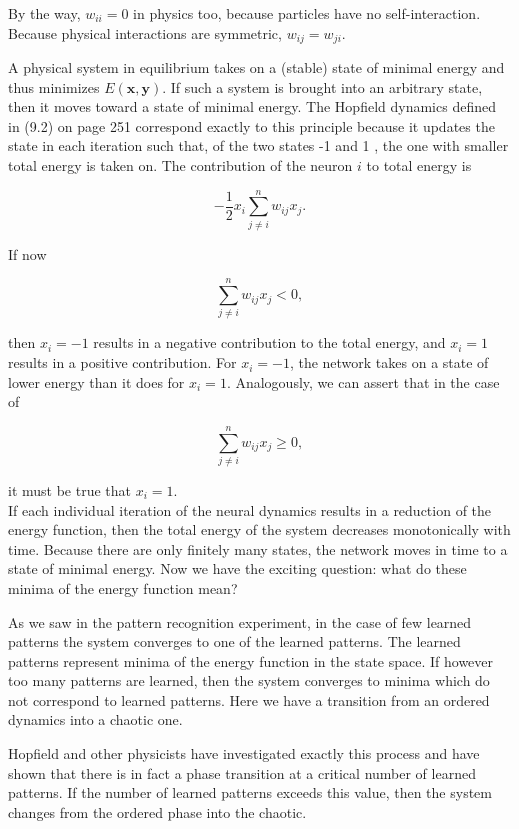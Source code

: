 \documentclass[10pt]{book}
\begin{document}
By the way, $w_{i i}=0$ in physics too, because particles have no self-interaction. Because physical interactions are symmetric, $w_{i j}=w_{j i}$.

A physical system in equilibrium takes on a (stable) state of minimal energy and thus minimizes $E(\boldsymbol{x}, \boldsymbol{y})$. If such a system is brought into an arbitrary state, then it moves toward a state of minimal energy. The Hopfield dynamics defined in (9.2) on page 251 correspond exactly to this principle because it updates the state in each iteration such that, of the two states -1 and 1 , the one with smaller total energy is taken on. The contribution of the neuron $i$ to total energy is

$$
-\frac{1}{2} x_{i} \sum_{j \neq i}^{n} w_{i j} x_{j} .
$$

If now

$$
\sum_{j \neq i}^{n} w_{i j} x_{j}<0,
$$

then $x_{i}=-1$ results in a negative contribution to the total energy, and $x_{i}=1$ results in a positive contribution. For $x_{i}=-1$, the network takes on a state of lower energy than it does for $x_{i}=1$. Analogously, we can assert that in the case of

$$
\sum_{j \neq i}^{n} w_{i j} x_{j} \geq 0,
$$

it must be true that $x_{i}=1$.\\
If each individual iteration of the neural dynamics results in a reduction of the energy function, then the total energy of the system decreases monotonically with time. Because there are only finitely many states, the network moves in time to a state of minimal energy. Now we have the exciting question: what do these minima of the energy function mean?

As we saw in the pattern recognition experiment, in the case of few learned patterns the system converges to one of the learned patterns. The learned patterns represent minima of the energy function in the state space. If however too many patterns are learned, then the system converges to minima which do not correspond to learned patterns. Here we have a transition from an ordered dynamics into a chaotic one.

Hopfield and other physicists have investigated exactly this process and have shown that there is in fact a phase transition at a critical number of learned patterns. If the number of learned patterns exceeds this value, then the system changes from the ordered phase into the chaotic.
\end{document}
